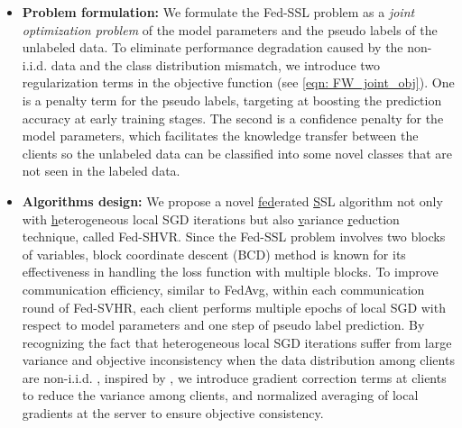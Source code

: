 \documentclass[twoside,journal]{IEEEtran}
\begin{document}
\begin{itemize}
\item {\bf Problem formulation:} We formulate the
  Fed-SSL problem as a \emph{joint optimization problem} of  the model parameters and  the  pseudo labels of the unlabeled data. To eliminate performance degradation caused by the non-i.i.d. data and the class distribution mismatch, we introduce two regularization terms in the objective function (see \eqref{eqn: FW_joint_obj}). One is a penalty term for the pseudo labels, targeting at  boosting the prediction accuracy at early training stages. The second is a confidence penalty for the model parameters, which facilitates the knowledge transfer between the clients so the unlabeled data can be classified into some novel classes that are not seen in the labeled data.
  \item {\bf Algorithms design:} We propose a novel  \underline{fed}erated \underline{S}SL
algorithm not only with \underline{h}eterogeneous local SGD iterations but also \underline{v}ariance
\underline{r}eduction technique,  called Fed-SHVR. Since the Fed-SSL problem involves two blocks of variables, block coordinate
descent (BCD) method is known for its effectiveness in handling the loss function with multiple blocks.  To improve communication efficiency, similar to FedAvg, within each communication round of  Fed-SVHR, each client performs multiple epochs of local SGD with respect to model parameters and one step of pseudo label prediction. By recognizing the fact that heterogeneous local SGD iterations suffer from large variance and objective inconsistency when the data distribution among clients are  non-i.i.d. \cite{wang2020tackling}, inspired by \cite{karimireddy2020scaffold,wang2020tackling}, we introduce  gradient correction terms at clients to reduce the variance among clients, and normalized averaging of local gradients at the server to ensure objective consistency.


\end{itemize}
\end{document}

